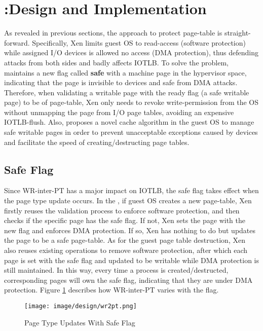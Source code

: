 \section{\name:Design and Implementation}
As revealed in previous sections, the approach to protect page-table is straight-forward. Specifically, Xen limits guest OS to read-access (software protection) while assigned I/O devices is allowed no access (DMA protection), thus defending attacks from both sides and badly affects IOTLB. To solve the problem, \name maintains a new flag called \textbf{safe} with a machine page in the hypervisor space, indicating that the page is invisible to devices and safe from DMA attacks. Therefore, when validating a writable page with the ready flag (a safe writable page) to be of page-table, Xen only needs to revoke write-permission from the OS without unmapping the page from I/O page tables, avoiding an expensive IOTLB-flush. Also, \name proposes a novel cache algorithm in the guest OS to manage safe writable pages in order to prevent unacceptable exceptions caused by devices and facilitate the speed of creating/destructing page tables.

\subsection{Safe Flag}
Since WR-inter-PT has a major impact on IOTLB, the safe flag takes effect when the page type update occurs. In the \name, if guest OS creates a new page-table, Xen firstly reuses the validation process to enforce software protection, and then checks if the specific page has the safe flag. If not, Xen sets the page with the new flag and enforces DMA protection. If so, Xen has nothing to do but updates the page to be a safe page-table. As for the guest page table destruction, Xen also reuses existing operations to remove software protection, after which each page is set with the safe flag and updated to be writable while DMA protection is still maintained. In this way, every time a process is created/destructed, corresponding pages will own the safe flag, indicating that they are under DMA protection. Figure \ref{fig:safe-flag} describes how WR-inter-PT varies with the flag.

\begin{figure}[ht]
\centering
\texttt{[image: image/design/wr2pt.png]} \\
\caption{Page Type Updates With Safe Flag}
\label{fig:safe-flag}
\end{figure}

